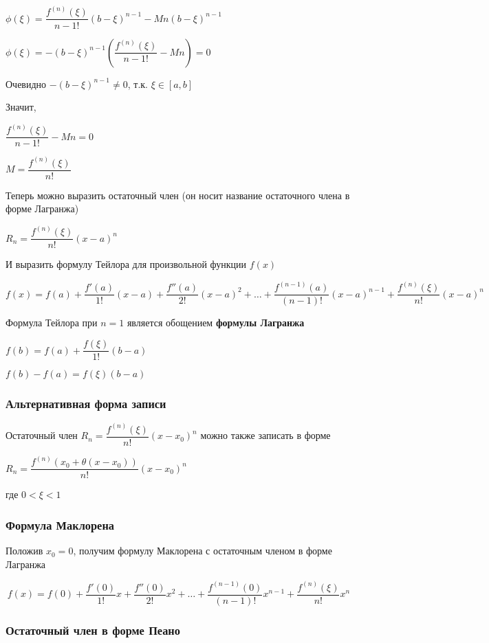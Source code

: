$ \phi(\xi) = \dfrac{f^{(n)}(\xi)}{n-1!}(b-\xi)^{n-1} - M n(b-\xi)^{n-1}  $

$ \phi(\xi) = -(b-\xi)^{n-1} \left( \dfrac{f^{(n)}(\xi)}{n-1!} - M n \right) =0 $

Очевидно $ -(b-\xi)^{n-1} \ne 0 $, т.к. $ \xi \in [a,b] $

Значит,

$ \dfrac{f^{(n)}(\xi)}{n-1!} - M n =0 $

$ M = \dfrac{f^{(n)}(\xi)}{n!} $

Теперь можно выразить остаточный член (он носит название остаточного члена в форме Лагранжа)

$ R_n = \dfrac{f^{(n)}(\xi)}{n!}(x-a)^{n} $

И выразить формулу Тейлора для произвольной функции $ f(x) $

$$
f(x) =
f(a) + \dfrac{f'(a)}{1!}(x-a) 
+ \dfrac{f''(a)}{2!}(x-a)^{2} 
+ \ldots
+ \dfrac{f^{(n-1)}(a)}{(n-1)!}(x-a)^{n-1} + \dfrac{f^{(n)}(\xi)}{n!}(x-a)^{n}
$$

Формула Тейлора при $ n=1 $ является обощением \textbf{формулы Лагранжа}

$ f(b) = f(a) + \dfrac{f(\xi)}{1!}(b-a) $

$ f(b) - f(a) = f(\xi)(b-a) $

\subsubsection{Альтернативная форма записи}

Остаточный член $ R_n = \dfrac{f^{(n)}(\xi)}{n!}(x-x_0)^{n} $ можно также записать в форме

$ R_n = \dfrac{f^{(n)}(x_0 + \theta (x-x_0))}{n!}(x-x_0)^{n} $

где $ 0 < \xi < 1 $

\subsubsection{Формула Маклорена}

Положив $ x_0 = 0 $, получим формулу Маклорена с остаточным членом в форме Лагранжа

$$
f(x) =
f(0) + \dfrac{f'(0)}{1!}x
+ \dfrac{f''(0)}{2!}x^{2} 
+ \ldots
+ \dfrac{f^{(n-1)}(0)}{(n-1)!}x^{n-1} + \dfrac{f^{(n)}(\xi)}{n!}x^{n}
$$

\subsubsection{Остаточный член в форме Пеано}

